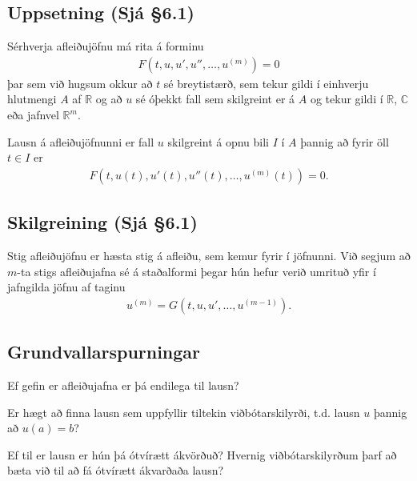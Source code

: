 \documentclass[a4paper,10pt,icelandic]{sphinxmanual}
\begin{document}
\subsection{Uppsetning (Sjá \S{}6.1)}
\label{\detokenize{Kafli06:uppsetning-sja-6-1}}
Sérhverja afleiðujöfnu má rita á forminu
\begin{equation*}
\begin{split}F(t,u,u',u'',\dots,u^{(m)})=0\end{split}
\end{equation*}
þar sem við hugsum okkur að \(t\) sé breytistærð, sem tekur gildi í einhverju hlutmengi \(A\) af \(\mathbb{R}\) og að \(u\) sé óþekkt fall sem skilgreint er á \(A\) og tekur gildi í \(\mathbb{R}\), \({\mathbb{C}}\) eða jafnvel \(\mathbb{R}^m\).

Lausn á afleiðujöfnunni er fall \(u\) skilgreint á opnu bili \(I\) í \(A\) þannig að fyrir öll \(t\in  I\) er
\begin{equation*}
\begin{split}F(t,u(t),u'(t),u''(t),\dots,u^{(m)}(t))=0.\end{split}
\end{equation*}

\subsection{Skilgreining (Sjá \S{}6.1)}
\label{\detokenize{Kafli06:id1}}
Stig afleiðujöfnu er hæsta stig á afleiðu, sem kemur fyrir í jöfnunni. Við segjum að \(m\)-ta stigs afleiðujafna sé á staðalformi þegar hún hefur verið umrituð yfir í jafngilda jöfnu af taginu
\begin{equation*}
\begin{split}u^{(m)}=G(t,u,u',\dots,u^{(m-1)}).\end{split}
\end{equation*}

\subsection{Grundvallarspurningar}
\label{\detokenize{Kafli06:grundvallarspurningar}}
Ef gefin er afleiðujafna er þá endilega til lausn?

Er hægt að finna lausn sem uppfyllir tiltekin viðbótarskilyrði, t.d. lausn \(u\) þannig að \(u(a)=b\)?

Ef til er lausn er hún þá ótvírætt ákvörðuð? Hvernig viðbótarskilyrðum þarf að bæta við til að fá ótvírætt ákvarðaða lausn?
\end{document}
